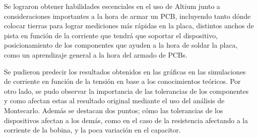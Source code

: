 \documentclass[a4paper]{article}
\begin{document}
Se lograron obtener habilidades escenciales en el uso de Altium junto a consideraciones importantes a la hora de armar un PCB, incluyendo tanto dónde colocar tierras para lograr mediciones más rápidas en la placa, distintos anchos de pista en función de la corriente que tendrá que soportar el dispositivo, posicionamiento de los componentes que ayuden a la hora de soldar la placa, como un aprendizaje general a la hora del armado de PCBs.

Se pudieron predecir los resultados obtenidos en las gráficas en las simulaciones de corriente en función de la tensión en base a los conocimientos teóricos. Por otro lado, se pudo observar la importancia de las tolerancias de los componentes y como afectan estas al resultado original mediante el uso del análisis de Montecarlo. Además se destacan dos puntos; cómo las tolerancias de los dispositivos afectan a los demás, como en el caso de la resistencia afectando a la corriente de la bobina, y la poca variación en el capacitor. 
\end{document}
